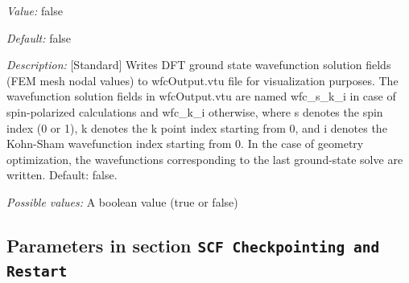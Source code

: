 \begin{itemize}
{\it Value:} false


{\it Default:} false


{\it Description:} [Standard] Writes DFT ground state wavefunction solution fields (FEM mesh nodal values) to wfcOutput.vtu file for visualization purposes. The wavefunction solution fields in wfcOutput.vtu are named wfc\_s\_k\_i in case of spin-polarized calculations and wfc\_k\_i otherwise, where s denotes the spin index (0 or 1), k denotes the k point index starting from 0, and i denotes the Kohn-Sham wavefunction index starting from 0. In the case of geometry optimization, the wavefunctions corresponding to the last ground-state solve are written.  Default: false.


{\it Possible values:} A boolean value (true or false)
\end{itemize}

\subsection{Parameters in section \tt SCF Checkpointing and Restart}
\label{parameters:SCF_20Checkpointing_20and_20Restart}

